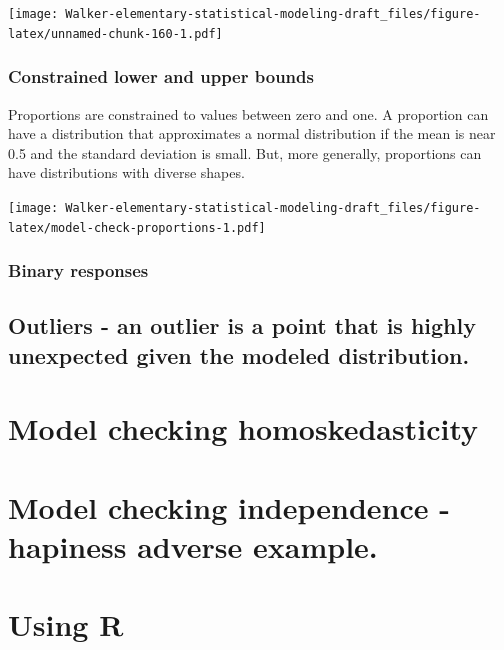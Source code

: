 \documentclass[]{book}
\begin{document}
\texttt{[image: Walker-elementary-statistical-modeling-draft\_files/figure-latex/unnamed-chunk-160-1.pdf]}

\hypertarget{constrained-lower-and-upper-bounds}{%
\subsubsection{Constrained lower and upper bounds}\label{constrained-lower-and-upper-bounds}}

Proportions are constrained to values between zero and one. A proportion can have a distribution that approximates a normal distribution if the mean is near 0.5 and the standard deviation is small. But, more generally, proportions can have distributions with diverse shapes.

\texttt{[image: Walker-elementary-statistical-modeling-draft\_files/figure-latex/model-check-proportions-1.pdf]}

\hypertarget{binary-responses}{%
\subsubsection{Binary responses}\label{binary-responses}}

\hypertarget{outliers---an-outlier-is-a-point-that-is-highly-unexpected-given-the-modeled-distribution.}{%
\subsection{Outliers - an outlier is a point that is highly unexpected given the modeled distribution.}\label{outliers---an-outlier-is-a-point-that-is-highly-unexpected-given-the-modeled-distribution.}}

\hypertarget{model-checking-homoskedasticity}{%
\section{Model checking homoskedasticity}\label{model-checking-homoskedasticity}}

\hypertarget{model-checking-independence---hapiness-adverse-example.}{%
\section{Model checking independence - hapiness adverse example.}\label{model-checking-independence---hapiness-adverse-example.}}

\hypertarget{using-r}{%
\section{Using R}\label{using-r}}
\end{document}
